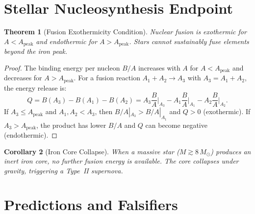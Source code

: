 \documentclass[12pt,a4paper]{article}
\newtheorem{theorem}{Theorem}[section]
\newtheorem{corollary}[theorem]{Corollary}
\theoremstyle{definition}
\theoremstyle{remark}
\begin{document}
\section{Stellar Nucleosynthesis Endpoint}
\label{sec:endpoint}

\begin{theorem}[Fusion Exothermicity Condition]
\label{thm:fusion}
Nuclear fusion is exothermic for $A < A_{\mathrm{peak}}$ and
endothermic for $A > A_{\mathrm{peak}}$.  Stars cannot
sustainably fuse elements beyond the iron peak.
\end{theorem}

\begin{proof}
The binding energy per nucleon $B/A$ increases with $A$ for
$A < A_{\mathrm{peak}}$ and decreases for $A > A_{\mathrm{peak}}$.
For a fusion reaction $A_1 + A_2 \to A_3$ with
$A_3 = A_1 + A_2$, the energy release is:
\begin{equation}
  Q = B(A_3) - B(A_1) - B(A_2)
  = A_3 \frac{B}{A}\bigg|_{A_3}
  - A_1 \frac{B}{A}\bigg|_{A_1}
  - A_2 \frac{B}{A}\bigg|_{A_2}.
\end{equation}
If $A_3 \leq A_{\mathrm{peak}}$ and
$A_1, A_2 < A_3$, then $B/A|_{A_3} > B/A|_{A_1}$ and $Q > 0$
(exothermic).  If $A_3 > A_{\mathrm{peak}}$, the product has
lower $B/A$ and $Q$ can become negative (endothermic).
\end{proof}

\begin{corollary}[Iron Core Collapse]
When a massive star ($M \gtrsim 8\,M_\odot$) produces an inert
iron core, no further fusion energy is available.  The core
collapses under gravity, triggering a Type~II supernova.
\end{corollary}

\section{Predictions and Falsifiers}
\label{sec:predictions}
\end{document}
